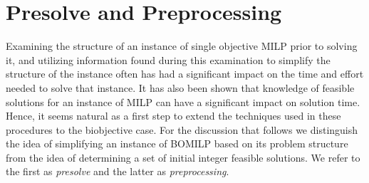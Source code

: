 \documentclass[11.5pt]{article}
\begin{document}
\section{Presolve and Preprocessing}\label{sec:pre}
Examining the structure of an instance of single objective MILP prior to solving it, and utilizing information found during this examination to simplify the structure of the instance often has had a significant impact on the time and effort needed to solve that instance. %
It has also been shown that knowledge of feasible solutions for an instance of MILP can have a significant impact on solution time. %
Hence, it seems natural as a first step to extend the techniques used in these procedures to the biobjective case. For the discussion that follows we distinguish the idea of simplifying an instance of BOMILP based on its problem structure from the idea of determining a set of initial integer feasible solutions. We refer to the first as \emph{presolve} and the latter as \emph{preprocessing}. %
\end{document}
